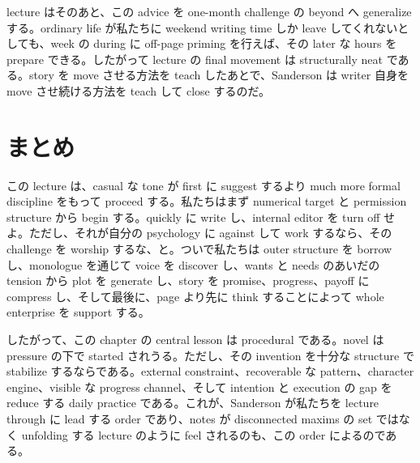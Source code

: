 lecture はそのあと、この advice を one-month challenge の beyond へ generalize する。ordinary life が私たちに weekend writing time しか leave してくれないとしても、week の during に off-page priming を行えば、その later な hours を prepare できる。したがって lecture の final movement は structurally neat である。story を move させる方法を teach したあとで、Sanderson は writer 自身を move させ続ける方法を teach して close するのだ。

\section{まとめ}

この lecture は、casual な tone が first に suggest するより much more formal discipline をもって proceed する。私たちはまず numerical target と permission structure から begin する。quickly に write し、internal editor を turn off せよ。ただし、それが自分の psychology に against して work するなら、その challenge を worship するな、と。ついで私たちは outer structure を borrow し、monologue を通じて voice を discover し、wants と needs のあいだの tension から plot を generate し、story を promise、progress、payoff に compress し、そして最後に、page より先に think することによって whole enterprise を support する。

したがって、この chapter の central lesson は procedural である。novel は pressure の下で started されうる。ただし、その invention を十分な structure で stabilize するならである。external constraint、recoverable な pattern、character engine、visible な progress channel、そして intention と execution の gap を reduce する daily practice である。これが、Sanderson が私たちを lecture through に lead する order であり、notes が disconnected maxims の set ではなく unfolding する lecture のように feel されるのも、この order によるのである。